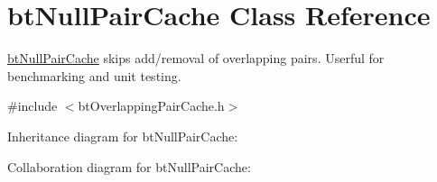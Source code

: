 \hypertarget{classbt_null_pair_cache}{\section{bt\+Null\+Pair\+Cache Class Reference}
\label{classbt_null_pair_cache}
}


\hyperlink{classbt_null_pair_cache}{bt\+Null\+Pair\+Cache} skips add/removal of overlapping pairs. Userful for benchmarking and unit testing.  




{\ttfamily \#include $<$bt\+Overlapping\+Pair\+Cache.\+h$>$}



Inheritance diagram for bt\+Null\+Pair\+Cache\+:


Collaboration diagram for bt\+Null\+Pair\+Cache\+:
